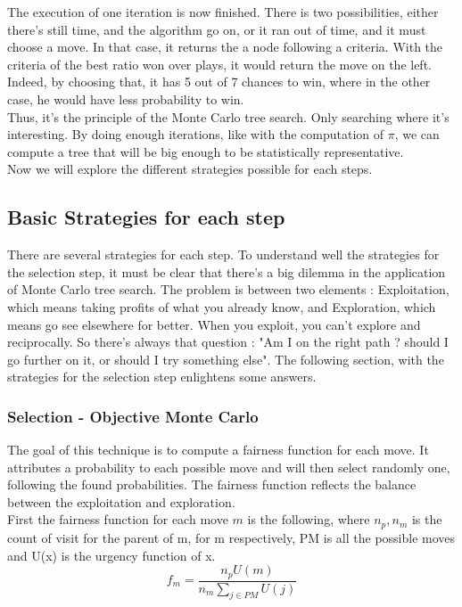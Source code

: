 The execution of one iteration is now finished. There is two possibilities, either there's still time, and the algorithm go on, or it ran out of time, and it must choose a move. In that case, it returns the a node following a criteria. With the criteria of the best ratio won over plays, it would return the move on the left. Indeed, by choosing that, it has 5 out of 7 chances to win, where in the other case, he would have less probability to win. 
\\

Thus, it's the principle of the Monte Carlo tree search. Only searching where it's interesting. By doing enough iterations, like with the computation of $\pi$, we can compute a tree that will be big enough to be statistically representative. 
\\

Now we will explore the different strategies possible for each steps. 

\subsection{Basic Strategies for each step}

There are several strategies for each step. To understand well the strategies for the selection step, it must be clear that there's a big dilemma in the application of Monte Carlo tree search. The problem is between two elements : Exploitation, which means taking profits of what you already know, and Exploration, which means go see elsewhere for better. When you exploit, you can't explore and reciprocally. So there's always that question : "Am I on the right path ? should I go further on it, or should I try something else". 
The following section, with the strategies for the selection step enlightens some answers. 

\subsubsection{Selection - Objective Monte Carlo}

The goal of this technique is to compute a fairness function for each move. It attributes a probability to each possible move and will then select randomly one, following the found probabilities. The fairness function reflects the balance between the exploitation and exploration.
\\

First the fairness function for each move $m$ is the following, where $n_p, n_m$ is the count of visit for the parent of m, for m respectively, PM is all the possible moves and U(x) is the urgency function of x. 
$$
f_m = \frac{n_p U(m)}{n_m \sum\nolimits_{j \in PM} U(j)}
$$


